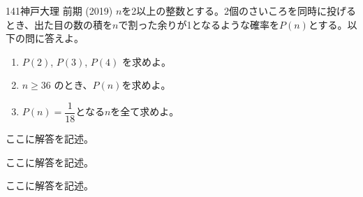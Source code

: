 \begin{thm}{141}{}{神戸大理 前期 (2019)}
 $n$を2以上の整数とする。2個のさいころを同時に投げるとき、出た目の数の積を$n$で割った余りが1となるような確率を$P(n)$とする。以下の問に答えよ。
 \begin{enumerate}
  \item $P(2)$, $P(3)$, $P(4)$ を求めよ。
  \item $n\ge 36$ のとき、$P(n)$を求めよ。
  \item $P(n)=\dfrac{1}{18}$となる$n$を全て求めよ。
 \end{enumerate}
\end{thm}

ここに解答を記述。

ここに解答を記述。

ここに解答を記述。